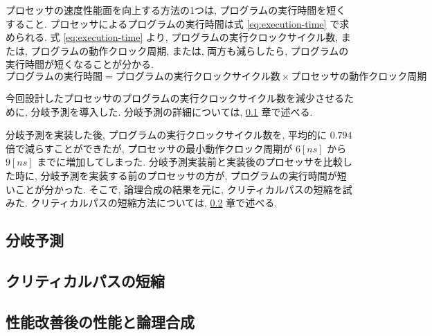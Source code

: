\documentclass[../main.tex]{subfiles}
\begin{document}
  プロセッサの速度性能面を向上する方法の1つは, プログラムの実行時間を短くすること.
  プロセッサによるプログラムの実行時間は式 \ref{eq:execution-time} で求められる.
  式 \ref{eq:execution-time} より, プログラムの実行クロックサイクル数, 
  または, プログラムの動作クロック周期, 
  または, 両方も減らしたら, プログラムの実行時間が短くなることが分かる.
  \begin{equation}
    プログラムの実行時間 = プログラムの実行クロックサイクル数 \times プロセッサの動作クロック周期
    \label{eq:execution-time}
  \end{equation}

  今回設計したプロセッサのプログラムの実行クロックサイクル数を減少させるために, 分岐予測を導入した.
  分岐予測の詳細については, \ref{subsection:jump-prediction} 章で述べる.

  分岐予測を実装した後, プログラムの実行クロックサイクル数を, 
  平均的に $0.794$ 倍で減らすことができたが, %
  プロセッサの最小動作クロック周期が $6[ns]$ から $9[ns]$ までに増加してしまった.
  分岐予測実装前と実装後のプロセッサを比較した時に, 
  分岐予測を実装する前のプロセッサの方が, 
  プログラムの実行時間が短いことが分かった.
  そこで, 論理合成の結果を元に, クリティカルパスの短縮を試みた.
  クリティカルパスの短縮方法については, \ref{subsection:critical-path} 章で述べる.

  \subsection{分岐予測} \label{subsection:jump-prediction}

  \subsection{クリティカルパスの短縮} \label{subsection:critical-path}
  

  \subsection{性能改善後の性能と論理合成}
  
\end{document}
